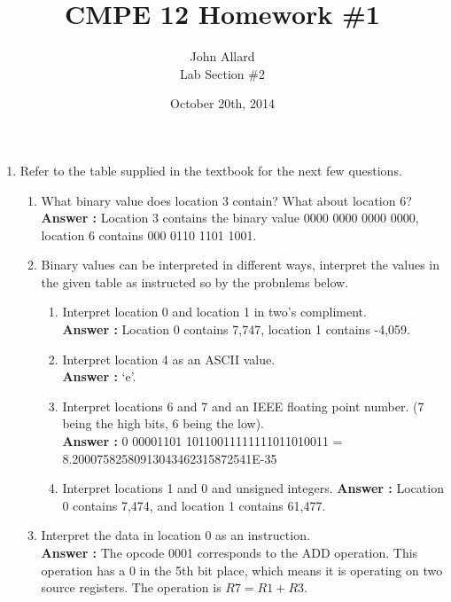 \documentclass[a4paper,11pt]{article}
\title{ CMPE 12 Homework \#1 \\[7 in]}
\author{John Allard \\ Lab Section \#2}
\date{October 20th, 2014}
\newcommand{\answer}{\textbf{Answer : }}
\begin{document}
\maketitle
\newpage


\begin{enumerate}

\item Refer to the table supplied in the textbook for the next few questions.
  
  \begin{enumerate}
  \item What binary value does location 3 contain? What about location 6? \\
  \answer Location 3 contains the binary value \small{0000 0000 0000 0000}, location 6 contains \small{000 0110 1101 1001}.

  \item Binary values can be interpreted in different ways, interpret the values in the given table as instructed so by the probnlems below.
    \begin{enumerate}
    \item Interpret location 0 and location 1 in two's compliment. \\
    \answer Location 0 contains 7,747, location 1 contains -4,059.
    \item Interpret location 4 as an ASCII value. \\
    \answer `e'.
    \item Interpret locations 6 and 7 and an IEEE floating point number. (7 being the high bits, 6 being the low). \\
    \answer \small{0 00001101 10110011111111011010011} = 8.20007582580913043462315872541E-35 
    \item Interpret locations 1 and 0 and unsigned integers.
    \answer Location 0 contains 7,474, and location 1 contains 61,477.
    \end{enumerate}

  \item Interpret the data in location 0 as an instruction. \\
  \answer The opcode \small{0001} corresponds to the ADD operation. This operation has a \small{0} in the 5th bit place, which means it is operating on two source registers. The operation is $R7= R1+R3$.


\end{enumerate}
\end{enumerate}
\end{document}
